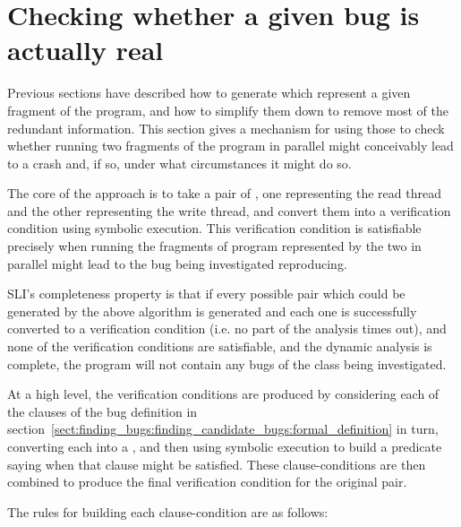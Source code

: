 \section{Checking whether a given bug is actually real}

Previous sections have described how to generate {\StateMachines}
which represent a given fragment of the program, and how to simplify
them down to remove most of the redundant information.  This section
gives a mechanism for using those {\StateMachines} to check whether
running two fragments of the program in parallel might conceivably
lead to a crash and, if so, under what circumstances it might do so.

The core of the approach is to take a pair of {\StateMachines}, one
representing the read thread and the other representing the write
thread, and convert them into a verification condition using symbolic
execution.  This verification condition is satisfiable precisely when
running the fragments of program represented by the two
{\StateMachines} in parallel might lead to the bug being investigated
reproducing.

SLI's completeness property is that if every possible \StateMachine
pair which could be generated by the above algorithm is generated and
each one is successfully converted to a verification condition
(i.e. no part of the analysis times out), and none of the verification
conditions are satisfiable, and the dynamic analysis is complete, the
program will not contain any bugs of the class being investigated.

At a high level, the verification conditions are produced by
considering each of the clauses of the bug definition in
section~\ref{sect:finding_bugs:finding_candidate_bugs:formal_definition}
in turn, converting each into a \StateMachine, and then using symbolic
execution to build a predicate saying when that clause might be
satisfied.  These clause-conditions are then combined to produce the
final verification condition for the original \StateMachine pair.

The rules for building each clause-condition are as follows:

